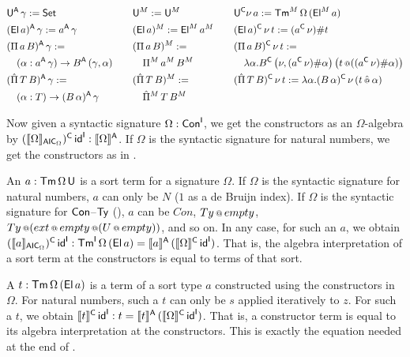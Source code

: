 \documentclass[a4paper,UKenglish,cleveref, autoref]{lipics-v2019}
\begin{document}
\begin{definition}
\begin{alignat*}{10}
    & \U^\A\,\gamma := \Set && && \U^M := \U^M && && \U^\C\nu\,a := \Tm^M\,\Omega\,(\El^M\,a) \\
    & (\El\,a)^\A\,\gamma := a^\A\,\gamma && && (\El\,a)^M := \El^M\,a^M && && (\El\,a)^\C\,\nu\,t := (a^\C\,\nu) \# t \\
    & (\Pi\,a\,B)^\A\,\gamma := && && (\Pi\,a\,B)^M := && && (\Pi\,a\,B)^\C\,\nu\,t :=  \\
    & \hspace{1em} (\alpha:a^\A\,\gamma)\ra B^\A\,(\gamma,\alpha) && && \hspace{1em} \Pi^M\,a^M\,B^M && && \hspace{1em} \lambda\alpha.B^\C\,\big(\nu, (a^\C\,\nu)\#\alpha\big)\,\big(t\oldapp ((a^\C\,\nu) \#\alpha)\big) \\
    & (\Pim\,T\,B)^\A\,\gamma := && && (\Pim\,T\,B)^M := && && (\Pim\,T\,B)^\C\,\nu\,t := \lambda\alpha.(B\,\alpha)^\C\,\nu\,(t\appm\alpha) \\
    & \hspace{1em} (\alpha:T)\ra(B\,\alpha)^\A\,\gamma && && \hspace{1em} \Pim^M\,T\,B^M && && 
  \end{alignat*}
\end{definition}
\begin{example}
  Now given a syntactic signature $\Omega:\mathsf{Con}^{\mathsf{I}}$, we get the
  constructors as an $\Omega$-algebra by
  $(\llbracket\Omega\rrbracket_{{\mathsf{A}\mathsf{I}\mathsf{C}}_\Omega})^{\mathsf{C}}\,\mathsf{id}^{\mathsf{I}} : \llbracket\Omega\rrbracket^{\mathsf{A}}$. If
  $\Omega$ is the syntactic signature for natural numbers, we get the
  constructors as in .

  An $a : \mathsf{Tm}\,\Omega\,\mathsf{U}$ is a sort term for a signature $\Omega$. If
  $\Omega$ is the syntactic signature for natural numbers, $a$ can
  only be $N$ ($1$ as a de Bruijn index). If $\Omega$ is the syntactic
  signature for $\mathsf{Con}$--$\mathsf{Ty}$ (), $a$ can be
  $Con$, $Ty\mathop{{\scriptstyle @}}{empty}$,
  $Ty\mathop{{\scriptstyle @}}({ext}\mathop{{\scriptstyle @}} {empty}\mathop{{\scriptstyle @}}(U\mathop{{\scriptstyle @}}{empty}))$, and so
  on. In any case, for such an $a$, we obtain
  $(\llbracket a\rrbracket_{{\mathsf{A}\mathsf{I}\mathsf{C}}_\Omega})^{\mathsf{C}}\,\mathsf{id}^{\mathsf{I}} : \mathsf{Tm}^{\mathsf{I}}\,\Omega\,(\mathsf{El}\,a)
  = \llbracket a\rrbracket^{\mathsf{A}}\,(\llbracket\Omega\rrbracket^{\mathsf{C}}\,\mathsf{id}^{\mathsf{I}})$. That is, the algebra
  interpretation of a sort term at the constructors is equal to terms
  of that sort.

  A $t : \mathsf{Tm}\,\Omega\,(\mathsf{El}\,a)$ is a term of a sort type $a$
  constructed using the constructors in $\Omega$. For natural numbers,
  such a $t$ can only be $s$ applied iteratively to $z$. For such a
  $t$, we obtain
  $\llbracket t\rrbracket^{\mathsf{C}}\,\mathsf{id}^{\mathsf{I}} : t = \llbracket
  t\rrbracket^{\mathsf{A}}\,(\llbracket\Omega\rrbracket^{\mathsf{C}}\,\mathsf{id}^{\mathsf{I}})$. That is, a constructor term is
  equal to its algebra interpretation at the constructors. This is
  exactly the equation needed at the end of .
\end{example}
\end{document}
